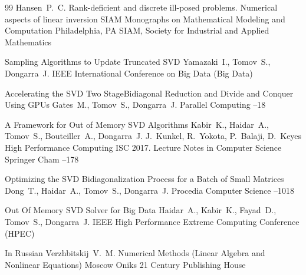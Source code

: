 \begin{thebibliography}{99}
\by   Hansen~P.~C.
\book Rank-deficient and discrete ill-posed problems. Numerical aspects of linear inversion
\serial SIAM Monographs on Mathematical Modeling and Computation
\publaddr Philadelphia, PA
\publ SIAM, Society for Industrial and Applied Mathematics

\paper Sampling Algorithms to Update Truncated SVD
\by Yamazaki~I., Tomov~S., Dongarra~J. 
\inbook  IEEE International Conference on Big Data (Big Data)


\paper Accelerating the SVD Two StageBidiagonal Reduction and Divide and Conquer Using GPUs
\by Gates~M., Tomov~S., Dongarra~J.
\jour  Parallel Computing
--18



\paper A Framework for Out of Memory SVD Algorithms
\by Kabir~K., Haidar~A., Tomov~S., Bouteiller~A., Dongarra~J.
 \eds J.~Kunkel, R.~Yokota, P.~Balaji, D.~Keyes  
 \inbook High Performance Computing
 \bookinfo ISC 2017. Lecture Notes in Computer Science
 \publ Springer
 \publaddr Cham
--178


\paper Optimizing the SVD Bidiagonalization Process for a Batch of Small Matrices
\by Dong~T., Haidar~A., Tomov~S., Dongarra~J.
\jour Procedia Computer Science
--1018


\paper  Out Of Memory SVD Solver for Big Data
\by Haidar~A., Kabir~K., Fayad~D., Tomov~S., Dongarra~J.
 IEEE High Performance Extreme Computing Conference (HPEC)

\lang In Russian
\by Verzhbitskij~V.~M.
\book Numerical Methods (Linear Algebra and Nonlinear Equations)
\publaddr Moscow
\publ Oniks 21 Century Publishing House

\end{thebibliography}


\newpage


$\;$



\makerutitle

